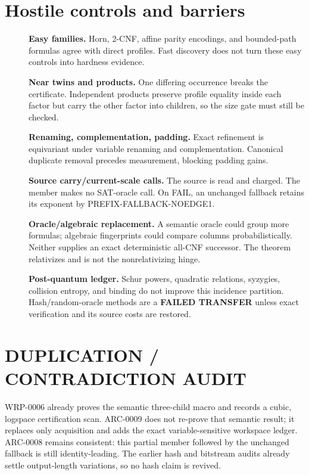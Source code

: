 \documentclass[11pt]{article}
\begin{document}
\section{Hostile controls and barriers}
\begin{description}
\item[] \textbf{Easy families.} Horn, 2-CNF, affine parity encodings, and
bounded-path formulas agree with direct profiles.  Fast discovery does not
turn these easy controls into hardness evidence.
\item[] \textbf{Near twins and products.} One differing occurrence breaks
the certificate.  Independent products preserve profile equality inside
each factor but carry the other factor into children, so the size gate must
still be checked.
\item[] \textbf{Renaming, complementation, padding.} Exact refinement is
equivariant under variable renaming and complementation.  Canonical duplicate
removal precedes measurement, blocking padding gains.
\item[] \textbf{Source carry/current-scale calls.} The source is read and
charged.  The member makes no SAT-oracle call.  On FAIL, an unchanged fallback
retains its exponent by PREFIX-FALLBACK-NOEDGE1.
\item[] \textbf{Oracle/algebraic replacement.} A semantic oracle could group
more formulas; algebraic fingerprints could compare columns probabilistically.
Neither supplies an exact deterministic all-CNF successor.  The theorem
relativizes and is not the nonrelativizing hinge.
\item[] \textbf{Post-quantum ledger.} Schur powers, quadratic relations,
syzygies, collision entropy, and binding do not improve this incidence
partition.  Hash/random-oracle methods are a \textbf{FAILED TRANSFER} unless
exact verification and its source costs are restored.
\end{description}

\section{DUPLICATION / CONTRADICTION AUDIT}
WRP-0006 already proves the semantic three-child macro and records a cubic,
logspace certification scan.  ARC-0009 does not re-prove that semantic result;
it replaces only acquisition and adds the exact variable-sensitive workspace
ledger.  ARC-0008 remains consistent: this partial member followed by the
unchanged fallback is still identity-leading.  The earlier hash and bitstream
audits already settle output-length variations, so no hash claim is revived.
\end{document}
